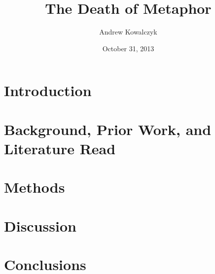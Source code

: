 \documentclass[11pt, oneside]{article}   	%
\title{The Death of Metaphor}
\author{Andrew Kowalczyk}
\date{October 31, 2013}							%
\begin{document}
\maketitle


\section{Introduction}
\cite{bae16}
\section{Background, Prior Work, and Literature Read}
\section{Methods}
\section{Discussion}
\section{Conclusions}



\end{document}
